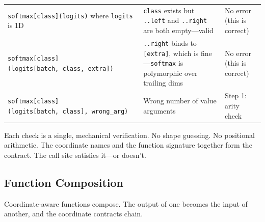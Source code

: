 \documentclass[11pt,titlepage]{article}
\begin{document}
\begin{longtable}[]{@{}lll@{}}
\begin{minipage}[t]{0.30\columnwidth}
\texttt{softmax{[}class{]}(logits)} where \texttt{logits} is 1D\strut
\end{minipage} & \begin{minipage}[t]{0.30\columnwidth}\raggedright
\texttt{class} exists but \texttt{..left} and \texttt{..right} are both
empty---valid\strut
\end{minipage} & \begin{minipage}[t]{0.30\columnwidth}\raggedright
No error (this is correct)\strut
\end{minipage}\tabularnewline
\begin{minipage}[t]{0.30\columnwidth}\raggedright
\texttt{softmax{[}class{]}(logits{[}batch,\ class,\ extra{]})}\strut
\end{minipage} & \begin{minipage}[t]{0.30\columnwidth}\raggedright
\texttt{..right} binds to \texttt{{[}extra{]}}, which is
fine---\texttt{softmax} is polymorphic over trailing dims\strut
\end{minipage} & \begin{minipage}[t]{0.30\columnwidth}\raggedright
No error (this is correct)\strut
\end{minipage}\tabularnewline
\begin{minipage}[t]{0.30\columnwidth}\raggedright
\texttt{softmax{[}class{]}(logits{[}batch,\ class{]},\ wrong\_arg)}\strut
\end{minipage} & \begin{minipage}[t]{0.30\columnwidth}\raggedright
Wrong number of value arguments\strut
\end{minipage} & \begin{minipage}[t]{0.30\columnwidth}\raggedright
Step 1: arity check\strut
\end{minipage}\tabularnewline
\bottomrule
\end{longtable}

Each check is a single, mechanical verification. No shape guessing. No
positional arithmetic. The coordinate names and the function signature
together form the contract. The call site satisfies it---or doesn't.

\vspace{2em}

\hypertarget{function-composition}{%
\subsection{Function Composition}\label{function-composition}}

Coordinate-aware functions compose. The output of one becomes the input
of another, and the coordinate contracts chain.
\end{document}
